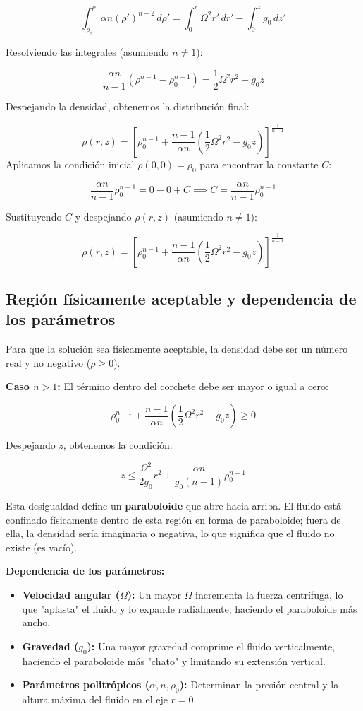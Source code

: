 \documentclass{article}
\begin{document}
$$ \int_{\rho_0}^{\rho} \alpha n (\rho')^{n-2} \, d\rho' = \int_0^r \Omega^2 r' \, dr' - \int_0^z g_0 \, dz' $$

Resolviendo las integrales (asumiendo $n \neq 1$):

$$ \frac{\alpha n}{n-1} \left( \rho^{n-1} - \rho_0^{n-1} \right) = \frac{1}{2} \Omega^2 r^2 - g_0 z $$

Despejando la densidad, obtenemos la distribución final:

$$ \rho(r,z) = \left[ \rho_0^{n-1} + \frac{n-1}{\alpha n} \left( \frac{1}{2} \Omega^2 r^2 - g_0 z \right) \right]^{\frac{1}{n-1}} $$
Aplicamos la condición inicial $\rho(0,0) = \rho_0$ para encontrar la constante $C$:

$$ \frac{\alpha n}{n-1} \rho_0^{n-1} = 0 - 0 + C \implies C = \frac{\alpha n}{n-1} \rho_0^{n-1} $$

Sustituyendo $C$ y despejando $\rho(r,z)$ (asumiendo $n \neq 1$):

$$ \rho(r,z) = \left[ \rho_0^{n-1} + \frac{n-1}{\alpha n} \left( \frac{1}{2} \Omega^2 r^2 - g_0 z \right) \right]^{\frac{1}{n-1}} $$

\subsection{Región físicamente aceptable y dependencia de los parámetros}

Para que la solución sea físicamente aceptable, la densidad debe ser un número real y no negativo ($\rho \ge 0$). 

\textbf{Caso $n > 1$:}
El término dentro del corchete debe ser mayor o igual a cero:

$$ \rho_0^{n-1} + \frac{n-1}{\alpha n} \left( \frac{1}{2} \Omega^2 r^2 - g_0 z \right) \ge 0 $$

Despejando $z$, obtenemos la condición:

$$ z \le \frac{\Omega^2}{2g_0} r^2 + \frac{\alpha n}{g_0(n-1)} \rho_0^{n-1} $$

Esta desigualdad define un \textbf{paraboloide} que abre hacia arriba. El fluido está confinado físicamente dentro de esta región en forma de paraboloide; fuera de ella, la densidad sería imaginaria o negativa, lo que significa que el fluido no existe (es vacío). 

\textbf{Dependencia de los parámetros:}
\begin{itemize}
    \item \textbf{Velocidad angular ($\Omega$):} Un mayor $\Omega$ incrementa la fuerza centrífuga, lo que "aplasta" el fluido y lo expande radialmente, haciendo el paraboloide más ancho.
    \item \textbf{Gravedad ($g_0$):} Una mayor gravedad comprime el fluido verticalmente, haciendo el paraboloide más "chato" y limitando su extensión vertical.
    \item \textbf{Parámetros politrópicos ($\alpha, n, \rho_0$):} Determinan la presión central y la altura máxima del fluido en el eje $r=0$.
\end{itemize}
\end{document}
